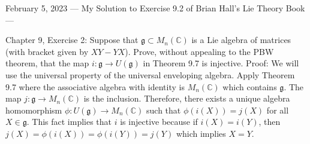 February 5, 2023
---
My Solution to Exercise 9.2 of Brian Hall's Lie Theory Book
---

Chapter 9, Exercise 2: Suppose that $\mathfrak{g} \subset M_n(\mathbb{C})$ is a Lie algebra of matrices (with bracket given by $XY-YX$). Prove, without appealing to the PBW theorem, that the map $i:\mathfrak{g}\to U(\mathfrak{g})$ in Theorem 9.7 is injective.
Proof: We will use the universal property of the universal enveloping algebra. Apply Theorem 9.7 where the associative algebra with identity is $M_n(\mathbb{C})$ which contains $\mathfrak{g}$. The map $j:\mathfrak{g}\to M_n(\mathbb{C})$ is the inclusion. Therefore, there exists a unique algebra homomorphism $\phi: U(\mathfrak{g}) \to M_n(\mathbb{C})$ such that $\phi(i(X)) = j(X)$ for all $X\in \mathfrak{g}$. This fact implies that $i$ is injective because if $i(X) = i(Y)$, then $j(X) = \phi(i(X)) = \phi(i(Y)) = j(Y)$ which implies $X=Y$.